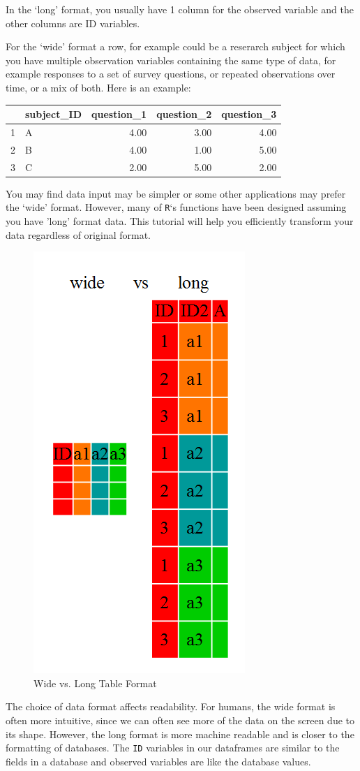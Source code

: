 \documentclass[
]{book}
\begin{document}
In the `long' format, you usually have 1 column for the observed variable and
the other columns are ID variables.

For the `wide' format a row, for example could be a reserarch subject for which you have multiple observation variables containing the same type of data, for example responses to a set of survey questions, or repeated observations over time, or a mix of both. Here is an example:

\begin{table}[ht]
\centering
\begin{tabular}{rlrrr}
  \hline
 & subject\_ID & question\_1 & question\_2 & question\_3 \\ 
  \hline
1 & A & 4.00 & 3.00 & 4.00 \\ 
  2 & B & 4.00 & 1.00 & 5.00 \\ 
  3 & C & 2.00 & 5.00 & 2.00 \\ 
   \hline
\end{tabular}
\end{table}

You may find data input may be simpler or some other
applications may prefer the `wide' format. However, many of \texttt{R}`s functions have
been designed assuming you have 'long' format data. This tutorial will help you
efficiently transform your data regardless of original format.

\begin{figure}
\includegraphics[width=0.3\linewidth]{img/wide-vs-long} \caption{Wide vs. Long Table Format}\label{fig:wide-vs-long}
\end{figure}

The choice of data format affects readability. For humans, the wide format is often more intuitive, since we can often see more of the data on the screen due to its shape. However, the long format is more machine readable and is closer to the formatting of databases. The \texttt{ID} variables in our dataframes are similar to the fields in a database and observed variables are like the database values.
\end{document}
